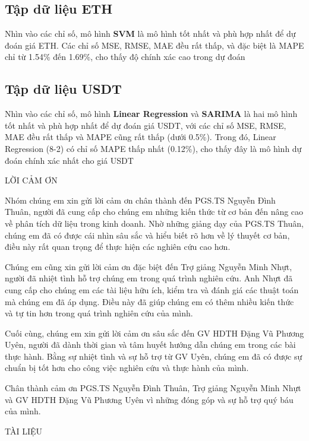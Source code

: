\documentclass[conference]{IEEEtran}
\begin{document}
\subsection{Tập dữ liệu ETH}
Nhìn vào các chỉ số, mô hình \textbf{SVM} là mô hình tốt nhất và phù hợp nhất để dự đoán giá ETH. Các chỉ số MSE, RMSE, MAE đều rất thấp, và đặc biệt là MAPE chỉ từ 1.54\% đến 1.69\%, cho thấy độ chính xác cao trong dự đoán

\subsection{Tập dữ liệu USDT}
Nhìn vào các chỉ số, mô hình \textbf{Linear Regression} và \textbf{SARIMA} là hai mô hình tốt nhất và phù hợp nhất để dự đoán giá USDT, với các chỉ số MSE, RMSE, MAE đều rất thấp và MAPE cũng rất thấp (dưới 0.5\%).
Trong đó, Linear Regression (8-2) có chỉ số MAPE thấp nhất (0.12\%), cho thấy đây là mô hình dự đoán chính xác nhất cho giá USDT

\begin{center}
    LỜI CẢM ƠN
\end{center}

Nhóm chúng em xin gửi lời cảm ơn chân thành đến PGS.TS Nguyễn Đình Thuân, người đã cung cấp cho chúng em những kiến thức từ cơ bản đến nâng cao về phân tích dữ liệu trong kinh doanh. Nhờ những giảng dạy của PGS.TS Thuân, chúng em đã có được cái nhìn sâu sắc và hiểu biết rõ hơn về lý thuyết cơ bản, điều này rất quan trọng để thực hiện các nghiên cứu cao hơn.

Chúng em cũng xin gửi lời cảm ơn đặc biệt đến Trợ giảng Nguyễn Minh Nhựt, người đã nhiệt tình hỗ trợ chúng em trong quá trình nghiên cứu. Anh Nhựt đã cung cấp cho chúng em các tài liệu hữu ích, kiểm tra và đánh giá các thuật toán mà chúng em đã áp dụng. Điều này đã giúp chúng em có thêm nhiều kiến thức và tự tin hơn trong quá trình nghiên cứu của mình.

Cuối cùng, chúng em xin gửi lời cảm ơn sâu sắc đến GV HDTH Đặng Vũ Phương Uyên, người đã dành thời gian và tâm huyết hướng dẫn chúng em trong các bài thực hành. Bằng sự nhiệt tình và sự hỗ trợ từ GV Uyên, chúng em đã có được sự chuẩn bị tốt hơn cho công việc nghiên cứu và thực hành của mình.

Chân thành cảm ơn PGS.TS Nguyễn Đình Thuân, Trợ giảng Nguyễn Minh Nhựt và GV HDTH Đặng Vũ Phương Uyên vì những đóng góp và sự hỗ trợ quý báu của mình.

\begin{center}
    TÀI LIỆU
\end{center}
\end{document}
